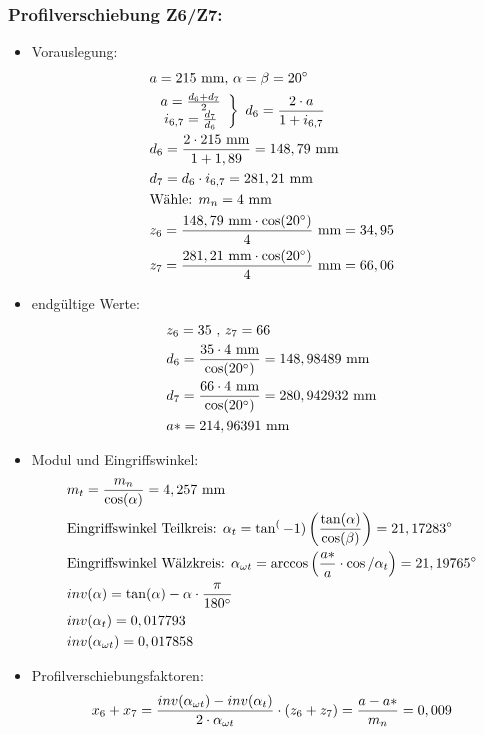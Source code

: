\subsubsection{Profilverschiebung Z6/Z7:}
\begin{itemize}
\item Vorauslegung:
\begin{align*}
	&a= 215 \text{ mm, } \alpha = \beta = 20^\circ \\
	&\left. \begin{array}{c} a= \frac{d_6 + d_7}{2}\\i_{6,7} = \frac{d_7}{d_6} \end{array} \right\} \text{ }d_6 = \frac{2 \cdot a}{1+i_{6,7}} \\
	&d_6 = \frac{2\cdot 215 \text{ mm}}{1+1,89} = 148,79\text{ mm} \\
	&d_7 = d_6 \cdot i_{6,7} = 281,21 \text{ mm}\\
	&\text{Wähle: }m_n = 4 \text{ mm} \\
	&z_6 = \frac{148,79 \text{ mm} \cdot \cos(20^\circ)}{4 } \text{ mm} = 34,95\\
	&z_7 = \frac{281,21 \text{ mm} \cdot \cos(20^\circ)}{4 } \text{ mm} = 66,06\\
\end{align*}
\item endgültige Werte:
\begin{align*}
	&z_6 = 35 \text{ , } z_7 = 66 \\
	&d_6 = \frac{35 \cdot 4\text{ mm} }{\cos(20^\circ)} = 148,98489 \text{ mm} \\
	&d_7 = \frac{66\cdot 4\text{ mm} }{\cos(20^\circ)} = 280,942932\text{ mm} \\
	&a* = 214,96391 \text{ mm} \\
\end{align*}
\item Modul und Eingriffswinkel:
\begin{align*}
	&m_t = \frac{m_n}{\cos(\alpha)} = 4,257\text{ mm} \\
	&\text{Eingriffswinkel Teilkreis: } \alpha_t = \tan^(-1) \left( \frac{\tan(\alpha)}{\cos(\beta)} \right) = 21,17283 ^\circ \\
	&\text{Eingriffswinkel Wälzkreis: } \alpha_{\omega t} = \arccos \left( \frac{a*}{a} \cdot \cos/\alpha_t\right) = 21,19765 ^\circ \\
	&inv(\alpha) = \tan(\alpha) -\alpha \cdot \frac{\pi}{180^\circ} \\
	&inv(\alpha_t) = 0,017793 \\
	&inv(\alpha_{\omega t}) = 0,017858 \\
\end{align*}
\item Profilverschiebungsfaktoren:
\begin{align*}
	&x_6 + x_7 = \frac{inv(\alpha_{\omega t})-inv(\alpha_{t})}{2 \cdot \alpha_{\omega t}} \cdot (z_6 + z_7) = \frac{a - a*}{m_n} = 0,009 \\
	\end{align*}
\end{itemize}
